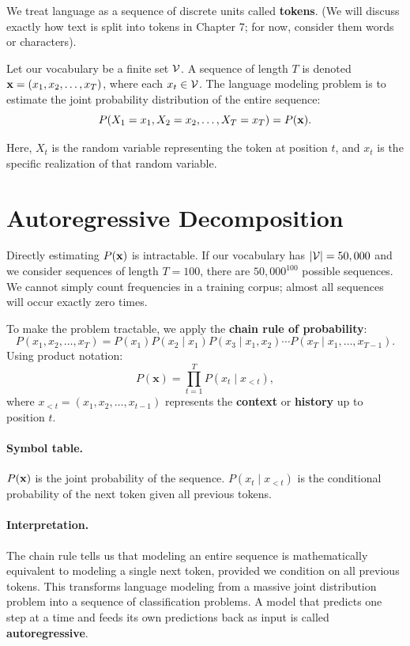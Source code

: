 We treat language as a sequence of discrete units called \textbf{tokens}. (We will discuss exactly how text is split into tokens in Chapter 7; for now, consider them words or characters).

Let our vocabulary be a finite set $\mathcal{V}$. A sequence of length $T$ is denoted $\mathbf{x} = (x_1, x_2, \ldots, x_T)$, where each $x_t \in \mathcal{V}$. The language modeling problem is to estimate the joint probability distribution of the entire sequence:
\begin{equation}
\label{eq:06:joint_prob}
P(X_1 = x_1, X_2 = x_2, \ldots, X_T = x_T) = P(\mathbf{x}).
\end{equation}

Here, $X_t$ is the random variable representing the token at position $t$, and $x_t$ is the specific realization of that random variable.

\section{Autoregressive Decomposition}
\label{ch:06:sec:main}

Directly estimating $P(\mathbf{x})$ is intractable. If our vocabulary has $|\mathcal{V}| = 50,000$ and we consider sequences of length $T=100$, there are $50,000^{100}$ possible sequences. We cannot simply count frequencies in a training corpus; almost all sequences will occur exactly zero times.

To make the problem tractable, we apply the \textbf{chain rule of probability}:
\begin{equation}
\label{eq:06:chain_rule}
P(x_1, x_2, \ldots, x_T) = P(x_1) P(x_2 \mid x_1) P(x_3 \mid x_1, x_2) \cdots P(x_T \mid x_1, \ldots, x_{T-1}).
\end{equation}
Using product notation:
\begin{equation}
\label{eq:06:product_form}
P(\mathbf{x}) = \prod_{t=1}^T P(x_t \mid x_{<t}),
\end{equation}
where $x_{<t} = (x_1, x_2, \ldots, x_{t-1})$ represents the \textbf{context} or \textbf{history} up to position $t$.

\paragraph{Symbol table.} $P(\mathbf{x})$ is the joint probability of the sequence. $P(x_t \mid x_{<t})$ is the conditional probability of the next token given all previous tokens.

\paragraph{Interpretation.} The chain rule tells us that modeling an entire sequence is mathematically equivalent to modeling a single next token, provided we condition on all previous tokens. This transforms language modeling from a massive joint distribution problem into a sequence of classification problems. A model that predicts one step at a time and feeds its own predictions back as input is called \textbf{autoregressive}.

